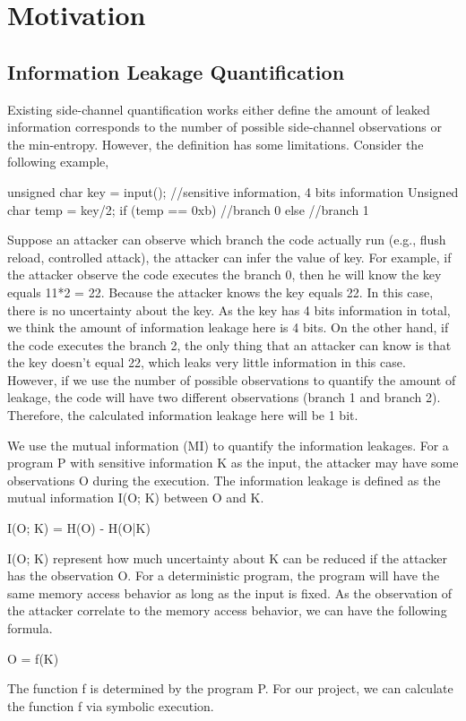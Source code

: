 \section{Motivation}
\subsection{Information Leakage Quantification}
Existing side-channel quantification works either define the amount of leaked information corresponds to the number of possible side-channel observations or the min-entropy. However, the definition has some limitations. Consider the following example,

unsigned char key = input(); //sensitive information, 4 bits information 
Unsigned char temp = key/2;
if (temp == 0xb)
//branch 0
else
//branch 1

Suppose an attacker can observe which branch the code actually run (e.g., flush reload, controlled attack), the attacker can infer the value of key. For example, if the attacker observe the code executes the branch 0, then he will know the key equals 11*2 = 22. Because the attacker knows the key equals 22. In this case, there is no uncertainty about the key. As the key has 4 bits information in total, we think the amount of information leakage here is 4 bits. On the other hand, if the code executes the branch 2, the only thing that an attacker can know is that the key doesn’t equal 22, which leaks very little information in this case.  However, if we use the number of possible observations to quantify the amount of leakage, the code will have two different observations (branch 1 and branch 2). Therefore, the calculated information leakage here will be 1 bit. 

We use the mutual information (MI) to quantify the information leakages. For a program P with sensitive information K as the input, the attacker may have some observations O during the execution. The information leakage is defined as the mutual information I(O; K) between O and K.

I(O; K) = H(O) - H(O|K)

I(O; K) represent how much uncertainty about K can be reduced if the attacker has the observation O.
For a deterministic program, the program will have the same memory access behavior as long as the input is fixed. As the observation of the attacker correlate to the memory access behavior, 
we can have the following formula.

O = f(K)

The function f is determined by the program P. For our project, we can calculate the function f via symbolic execution.

